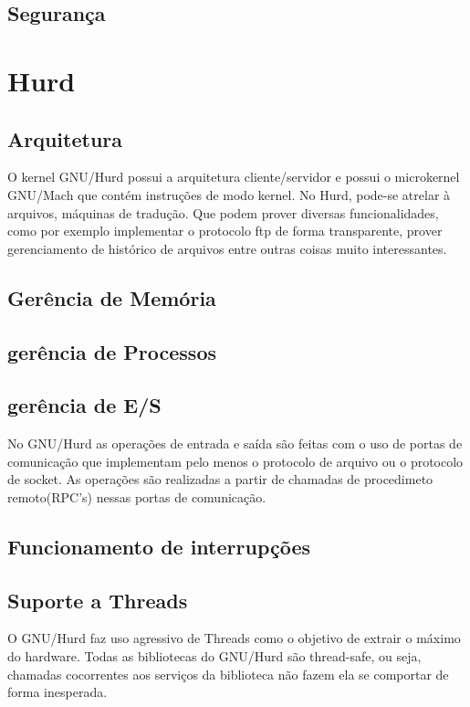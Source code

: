 \documentclass[conference]{IEEEtran}
\begin{document}
\subsection{Segurança}\label{sec:BSDSec}

\section{Hurd}\label{sec:Hurd}

\subsection{Arquitetura}\label{sec:HurdArq}
O kernel GNU/Hurd possui a arquitetura cliente/servidor e possui o microkernel GNU/Mach que contém instruções de modo kernel. No Hurd, pode-se atrelar à arquivos, máquinas de tradução. Que podem prover diversas funcionalidades, como por exemplo implementar o protocolo ftp de forma transparente, prover gerenciamento de histórico de arquivos entre outras coisas muito interessantes.\cite{HurdPaper}

\subsection{Gerência de Memória}\label{sec:HurdMem}

\subsection{gerência de Processos}\label{sec:HURDPROC}

\subsection{gerência de E/S}\label{sec:HurdES}
No GNU/Hurd as operações de entrada e saída são feitas com o uso de portas de comunicação que implementam pelo menos o protocolo de arquivo ou o protocolo de socket. As operações são realizadas a partir de chamadas de procedimeto remoto(RPC's) nessas portas de comunicação\cite{HurdIO}.

\subsection{Funcionamento de interrupções}\label{sec:HurdInt}

\subsection{Suporte a Threads}\label{sec:HurdThreads}
O GNU/Hurd faz uso agressivo de Threads como o objetivo de extrair o máximo do hardware.\cite{Hurd} Todas as bibliotecas do GNU/Hurd são thread-safe, ou seja, chamadas cocorrentes aos serviços da biblioteca não fazem ela se comportar de forma inesperada.
\end{document}
